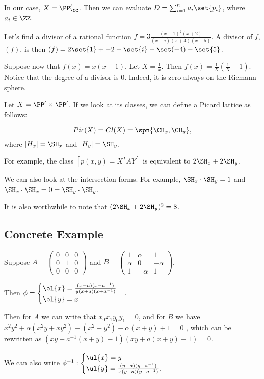 \documentclass[11pt]{scrartcl}
\begin{document}
  In our case, $X = \PP_{\CC}'$. Then we can evaluate
  $D = \sum_{i=1}^{n} a_{i} \set{p_{i}}$, where $a_{i} \in \ZZ$.

  Let's find a divisor of a rational function
  $f = 3 \frac{(x-1)^{2}(x+2)}{(x-i)(x+4)(x-5)}$. A divisor of $f$,
  $(f)$, is then $(f) = 2\set{1}+{-2} - \set{i} - \set(-4) - \set{5}$.

  Suppose now that $f(x) = x(x-1)$. Let $X = \frac{1}{x}$. Then
  $f(x) = \frac{1}{X}(\frac{1}{X} - 1)$. Notice that the degree of a
  divisor is 0. Indeed, it is zero always on the Riemann sphere.

  Let $X = \PP' \times \PP'$. If we look at its classes, we can define a Picard lattice as follows:
  
  \begin{equation}
    Pic(X) = Cl(X) = \spn{\CH_{x}, \CH_{y}}, 
  \end{equation}
  where $[H_{x}] = \SH_{x}$ and $[H_{y}] = \SH_{y}$.

  For example, the class $[p(x, y) = X^{T} A Y]$ is equivalent to $ 2\SH_{x} + 2\SH_{y}$.

  We can also look at the intersection forms. For example,
  $\SH_{x} \cdot \SH_{y} = 1$ and
  $\SH_{x} \cdot \SH_{x} = 0 = \SH_{y} \cdot \SH_{y}$.

  It is also worthwhile to note that $(2\SH_{x} + 2\SH_{y})^{2} = 8$.

  \subsection{Concrete Example}

  Suppose $A = \begin{pmatrix}
    0 & 0 & 0\\
    0 & 1 & 0\\
    0 & 0 & 0
  \end{pmatrix}$ and $B = \begin{pmatrix}
    1 & \alpha & 1 \\
    \alpha & 0 & - \alpha\\
    1 & -\alpha & 1
  \end{pmatrix}$.

  Then $\phi = \begin{cases}
    \ol{x} = \frac{(x-a)(x-a^{-1})}{y(x+a)(x+a^{-1})}\\
    \ol{y} = x
  \end{cases}$.

  Then for $A$ we can write that $x_{0}x_{1}y_{0}y_{1} = 0$, and for
  $B$ we have
  $x^{2}y^{2}+\alpha(x^{2}y + xy^{2})+ (x^{2}+y^{2}) - \alpha(x+y) + 1
  = 0$ , which can be rewritten as
  $(xy+a^{-1}(x+y) - 1)(xy+a(x+y) - 1) = 0$.

  We can also write $\phi^{-1}: \begin{cases}
    \ul{x} = y\\
    \ul{y} = \frac{(y-a)(y-a^{-1})}{x(y+a)(y+a^{-1})}.
  \end{cases}$

  
\end{document}
